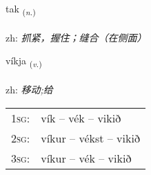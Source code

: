 \documentclass[frontgrid, backgrid]{flacards}\usepackage[]{graphicx}\usepackage[]{color}
\begin{document}
\renewcommand{\flhead}{\vskip5pt \fboxsep=0pt {\small\bfseries\footnotesize Nafnorð | 名词}}
\renewcommand{\fcfoot}{\vskip5pt \fboxsep=0pt \hspace{2pt}{\small\bfseries\footnotesize 2K}}

\renewcommand{\blhead}{\vskip5pt {\small\bfseries\footnotesize Nafnorð | 名词 }}
\renewcommand{\bcfoot}{\vskip5pt \hspace{2pt}{\small\bfseries\footnotesize 2K}}


{tak \small{\textsubscript{(\textit{n.})}} \\[1ex] %
\textphonetic{[tʰaːk]} \\
zh: \emph{抓紧，握住；缝合（在侧面）} \\  [2ex]
\renewcommand*{\arraystretch}{0.8}
}

\renewcommand{\flhead}{\vskip5pt \fboxsep=0pt {\small\bfseries\footnotesize Sagnorð | 动词}}
\renewcommand{\fcfoot}{\vskip5pt \fboxsep=0pt \hspace{2pt}{\small\bfseries\footnotesize 2K}}

\renewcommand{\blhead}{\vskip5pt {\small\bfseries\footnotesize Sagnorð | 动词 }}
\renewcommand{\bcfoot}{\vskip5pt \hspace{2pt}{\small\bfseries\footnotesize 2K}}


{víkja \small{\textsubscript{(\textit{v.})}} \\[1ex] %
\textphonetic{[viːca]} \\
zh: \emph{移动;给} \\  [2ex]
\renewcommand*{\arraystretch}{0.8}
\begin{tabular}{p{1cm}l}
\textsc{1sg}: & vík -- vék -- vikið \\ 
\textsc{2sg}: & víkur -- vékst -- vikið \\ 
\textsc{3sg}: & víkur -- vék -- vikið \\ 
\end{tabular}
}
\end{document}
